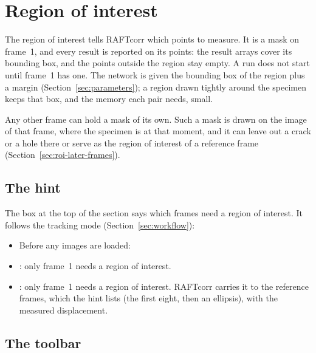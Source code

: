 \section{Region of interest}
\label{sec:roi}

The region of interest tells RAFTcorr which points to measure. It is a mask on frame~1, and
every result is reported on its points: the result arrays cover its bounding box, and the points
outside the region stay empty. A run does not start until frame~1 has one. The network is given
the bounding box of the region plus a margin (Section~\ref{sec:parameters}); a region drawn
tightly around the specimen keeps that box, and the memory each pair needs, small.

Any other frame can hold a mask of its own. Such a mask is drawn on the image of that frame,
where the specimen is at that moment, and it can leave out a crack or a hole there or serve as
the region of interest of a reference frame (Section~\ref{sec:roi-later-frames}).

\subsection{The hint}

The box at the top of the  section says which frames need a region of
interest. It follows the tracking mode (Section~\ref{sec:workflow}):
\begin{itemize}
  \item Before any images are loaded: 
  \item {}: only frame~1 needs a region of interest. 
  \item {}: only frame~1 needs a region of interest. RAFTcorr carries it to the
        reference frames, which the hint lists (the first eight, then an ellipsis), with the
        measured displacement. 
\end{itemize}

\subsection{The toolbar}


